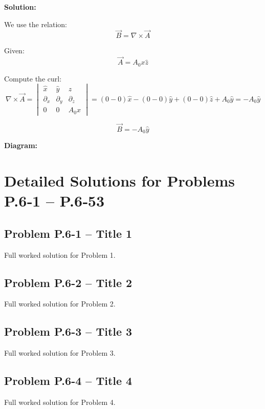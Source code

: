 \documentclass[12pt]{article}
\begin{document}
\textbf{Solution:}

We use the relation:
\[
\vec{B} = \nabla \times \vec{A}
\]

Given:
\[
\vec{A} = A_0 x \hat{z}
\]

Compute the curl:
\[
\nabla \times \vec{A} =
\begin{vmatrix}
\hat{x} & \hat{y} & \hat{z} \\
\partial_x & \partial_y & \partial_z \\
0 & 0 & A_0 x
\end{vmatrix}
= \left( 0 - 0 \right)\hat{x} - \left( 0 - 0 \right)\hat{y} + \left( 0 - 0 \right)\hat{z} + A_0 \hat{y}
= -A_0 \hat{y}
\]

\begin{tcolorbox}
\[
\boxed{\vec{B} = -A_0 \hat{y}}
\]
\end{tcolorbox}

\textbf{Diagram:}
\begin{center}
\end{center}



\section*{Detailed Solutions for Problems P.6‑1 – P.6‑53}

\subsection*{Problem P.6-1 – Title 1}
Full worked solution for Problem 1.


\subsection*{Problem P.6-2 – Title 2}
Full worked solution for Problem 2.


\subsection*{Problem P.6-3 – Title 3}
Full worked solution for Problem 3.


\subsection*{Problem P.6-4 – Title 4}
Full worked solution for Problem 4.
\end{document}
